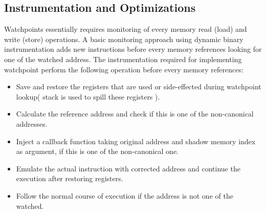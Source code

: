 

\subsection {Instrumentation and Optimizations}
Watchpoints essentially requires monitoring of every memory read (load) and write (store) operations. A basic monitoring approach using dynamic binary instrumentation adds new instructions before every memory references looking for one of the watched address. %
The instrumentation required for implementing watchpoint perform the following operation before every memory references: 

\begin{itemize}
	\item Save and restore the registers that are used or side-effected during watchpoint lookup( stack is used to spill these registers ).
	\item Calculate the reference address and check if this is one of the non-canonical addresses.
	\item Inject a callback function taking original address and shadow memory index as argument, if this is one of the non-canonical one. 
	\item Emulate the actual instruction with corrected address and continue the execution after restoring registers.
	\item Follow the normal course of execution if the address is not one of the watched.
\end{itemize}


